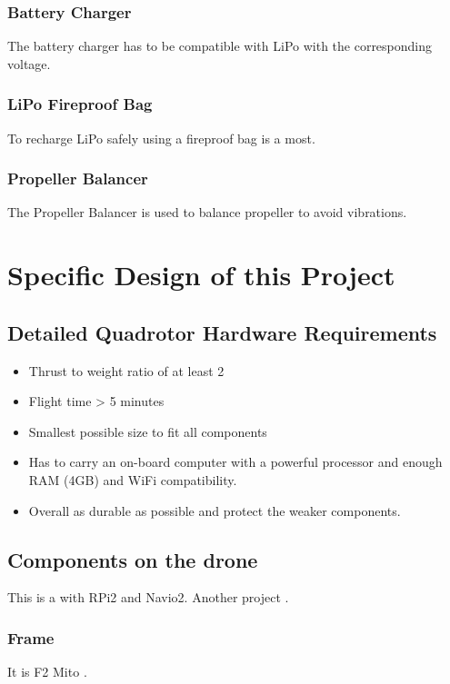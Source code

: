\subsubsection{Battery Charger}
The battery charger has to be compatible with LiPo with the corresponding voltage.

\subsubsection{LiPo Fireproof Bag}
To recharge LiPo safely using a fireproof bag is a most.

\subsubsection{Propeller Balancer}
The Propeller Balancer is used to balance propeller to avoid vibrations.


\section{Specific Design of this Project}

\subsection{Detailed Quadrotor Hardware Requirements}
\begin{itemize}
    \item Thrust to weight ratio of at least 2
    \item Flight time > 5 minutes
    \item Smallest possible size to fit all components
    \item Has to carry an on-board computer with a powerful processor and enough RAM (4GB) and WiFi compatibility.
    \item Overall as durable as possible and protect the weaker components.
\end{itemize}

\subsection{Components on the drone}


This is a \cite{hackaday_navio} with RPi2 and Navio2.
Another project \cite{instructables_navio}.

\subsubsection{Frame}
It is F2 Mito \cite{bangood_f2_mito}.

